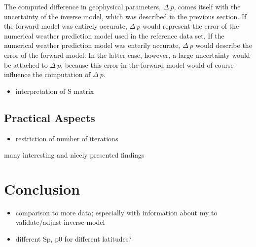 \documentclass[11pt, a4paper]{article}
\begin{document}
The computed difference in geophysical parameters, \(\Delta \ p\), comes itself with the uncertainty of the inverse model, which was described in the previous section. If the forward model was entirely accurate, \(\Delta \ p\) would represent the error of the numerical weather prediction model used in the reference data set. If the numerical weather prediction model was enterily accurate, \(\Delta \ p\) would describe the error of the forward model. In the latter case, however, a large uncertainty would be attached to \(\Delta \ p\), because this error in the forward model would of course influence the computation of \(\Delta \ p\).









\vspace{2.5cm}

\begin{itemize}
\item interpretation of S matrix
\end{itemize}


\subsection{Practical Aspects}

\begin{itemize}
\item restriction of number of iterations
\end{itemize}






\vspace{5cm}
many interesting and nicely presented findings





\clearpage
\section{Conclusion}

\begin{itemize}
\item comparison to more data; especially with information about my to validate/adjust inverse model
\item different Sp, p0 for different latitudes? %
\end{itemize}
\end{document}
